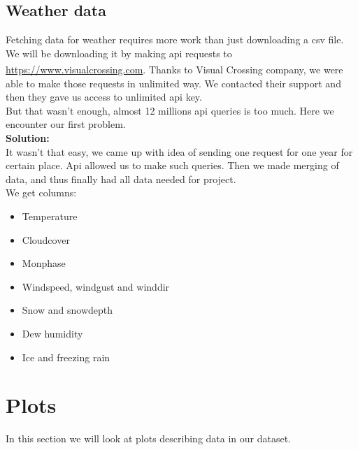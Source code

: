 \documentclass{article}
\begin{document}
	\subsection{Weather data}
		Fetching data for weather requires more work than just downloading a csv file.
		We will be downloading it by making api requests to \url{https://www.visualcrossing.com}.
		Thanks to Visual Crossing\textsuperscript{\tiny\textregistered} company, we were able to make those requests in unlimited way.
		We contacted their support and then they gave us access to unlimited api key. 	\\
		But that wasn't enough, almost 12 millions api queries is too much. Here we encounter
		our first problem.\\
		\textbf{Solution:}\\
		It wasn't that easy, we came up with idea of sending one request for one year for certain place.
		Api allowed us to make such queries. Then we made merging of data, and thus finally had all data needed
		for project.\\		

		We get columns:

			\begin{itemize}
\item Temperature
\item Cloudcover
\item Monphase
\item Windspeed, windgust and winddir
\item Snow and snowdepth
\item Dew humidity
\item Ice and freezing rain
				
			\end{itemize}
\newpage
\section{Plots}
In this section we will look at plots describing data in our dataset.
	
\end{document}
